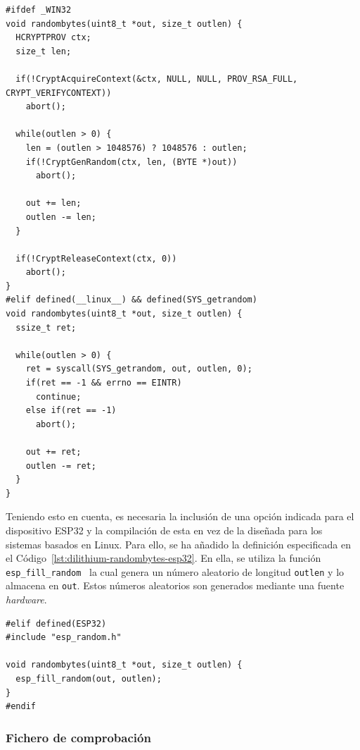 \begin{lstlisting}[label={lst:dilithium-randombytes},style=Cnice,firstnumber=1,caption={Archivo \texttt{Dilithium/main/src/randombytes.c}.}]
#ifdef _WIN32
void randombytes(uint8_t *out, size_t outlen) {
  HCRYPTPROV ctx;
  size_t len;

  if(!CryptAcquireContext(&ctx, NULL, NULL, PROV_RSA_FULL, CRYPT_VERIFYCONTEXT))
    abort();

  while(outlen > 0) {
    len = (outlen > 1048576) ? 1048576 : outlen;
    if(!CryptGenRandom(ctx, len, (BYTE *)out))
      abort();

    out += len;
    outlen -= len;
  }

  if(!CryptReleaseContext(ctx, 0))
    abort();
}
#elif defined(__linux__) && defined(SYS_getrandom)
void randombytes(uint8_t *out, size_t outlen) {
  ssize_t ret;

  while(outlen > 0) {
    ret = syscall(SYS_getrandom, out, outlen, 0);
    if(ret == -1 && errno == EINTR)
      continue;
    else if(ret == -1)
      abort();

    out += ret;
    outlen -= ret;
  }
}
\end{lstlisting}

Teniendo esto en cuenta, es necesaria la inclusión de una opción indicada para el dispositivo ESP32 y la compilación de esta en vez de la diseñada para los sistemas basados en Linux.
Para ello, se ha añadido la definición especificada en el Código~\ref{lst:dilithium-randombytes-esp32}.
En ella, se utiliza la función \texttt{esp\_fill\_random}~\cite{esp32-random} la cual genera un número aleatorio de longitud \texttt{outlen} y lo almacena en \texttt{out}.
Estos números aleatorios son generados mediante una fuente \textit{hardware}.

\begin{lstlisting}[label={lst:dilithium-randombytes-esp32},style=Cnice,firstnumber=1,caption={Generación de números aleatorios para ESP32.}]
#elif defined(ESP32)
#include "esp_random.h"

void randombytes(uint8_t *out, size_t outlen) {
  esp_fill_random(out, outlen);
}
#endif
\end{lstlisting}


\subsubsection{Fichero de comprobación}\label{subsubsec:dilithium-main}

